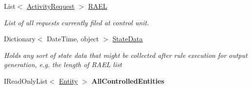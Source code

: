\begin{DoxyCompactItemize}
\item 
List$<$ \hyperlink{class_simulation_core_1_1_h_c_c_m_elements_1_1_activity_request}{Activity\+Request} $>$ \hyperlink{class_simulation_core_1_1_h_c_c_m_elements_1_1_control_unit_a9b5aa3d4737ceb8310badb24ce476169}{R\+A\+EL}
\begin{DoxyCompactList}\small\item\em List of all requests currently filed at control unit. \end{DoxyCompactList}\item 
Dictionary$<$ Date\+Time, object $>$ \hyperlink{class_simulation_core_1_1_h_c_c_m_elements_1_1_control_unit_a51b80cf1eebe463edcb3a7e2f1355878}{State\+Data}
\begin{DoxyCompactList}\small\item\em Holds any sort of state data that might be collected after rule execution for output generation, e.\+g. the length of R\+A\+EL list \end{DoxyCompactList}\item 
I\+Read\+Only\+List$<$ \hyperlink{class_simulation_core_1_1_h_c_c_m_elements_1_1_entity}{Entity} $>$ {\bfseries All\+Controlled\+Entities}\hypertarget{class_simulation_core_1_1_h_c_c_m_elements_1_1_control_unit_acd7d4df480636e7b702fe0a14b6fe068}{}\label{class_simulation_core_1_1_h_c_c_m_elements_1_1_control_unit_acd7d4df480636e7b702fe0a14b6fe068}


\end{DoxyCompactItemize}
